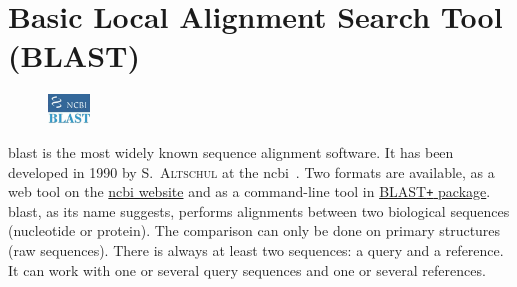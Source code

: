 \section{Basic Local Alignment Search Tool (BLAST)}
\label{sec:blast}
\begin{figure}
    \vspace{-1.2em}
    \includegraphics[width=0.1\textwidth]{img/blast}
\end{figure}

\acrshort{blast} is the most widely known sequence alignment software. It has been developed in 1990 by S.~\textsc{Altschul} at the \gls{ncbi}~\cite{Altschul1990}. Two formats are available, as a web tool on the \href{http://blast.ncbi.nlm.nih.gov/Blast.cgi}{\gls{ncbi} website} and as a command-line tool in \href{ftp://ftp.ncbi.nlm.nih.gov/blast/executables/blast+/LATEST/}{BLAST\texttt{+} package}.
\gls{blast}, as its name suggests, performs alignments between two biological sequences (nucleotide or protein).
The comparison can only be done on primary structures (raw sequences).
There is always at least two sequences: a query and a reference.
It can work with one or several query sequences and one or several references.

